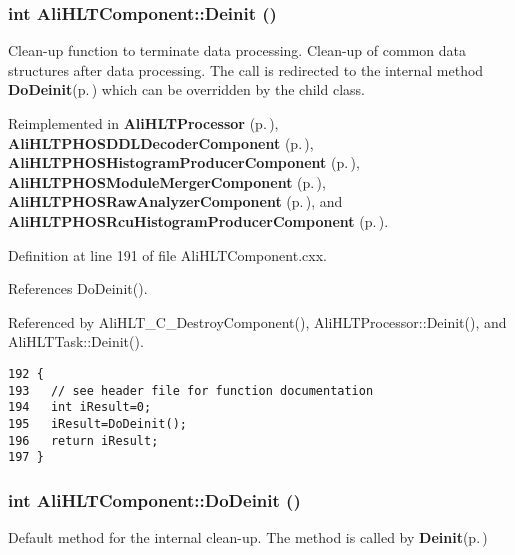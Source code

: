 \subsubsection{\setlength{\rightskip}{0pt plus 5cm}int Ali\-HLTComponent::Deinit ()\hspace{0.3cm}{\tt  [virtual]}}\label{classAliHLTComponent_a5}


Clean-up function to terminate data processing. Clean-up of common data structures after data processing. The call is redirected to the internal method {\bf Do\-Deinit}{\rm (p.\,\pageref{classAliHLTComponent_b6})} which can be overridden by the child class. 

Reimplemented in {\bf Ali\-HLTProcessor} {\rm (p.\,\pageref{classAliHLTProcessor_a3})}, {\bf Ali\-HLTPHOSDDLDecoder\-Component} {\rm (p.\,\pageref{classAliHLTPHOSDDLDecoderComponent_a5})}, {\bf Ali\-HLTPHOSHistogram\-Producer\-Component} {\rm (p.\,\pageref{classAliHLTPHOSHistogramProducerComponent_a5})}, {\bf Ali\-HLTPHOSModule\-Merger\-Component} {\rm (p.\,\pageref{classAliHLTPHOSModuleMergerComponent_a5})}, {\bf Ali\-HLTPHOSRaw\-Analyzer\-Component} {\rm (p.\,\pageref{classAliHLTPHOSRawAnalyzerComponent_a5})}, and {\bf Ali\-HLTPHOSRcu\-Histogram\-Producer\-Component} {\rm (p.\,\pageref{classAliHLTPHOSRcuHistogramProducerComponent_a3})}.

Definition at line 191 of file Ali\-HLTComponent.cxx.

References Do\-Deinit().

Referenced by Ali\-HLT\_\-C\_\-Destroy\-Component(), Ali\-HLTProcessor::Deinit(), and Ali\-HLTTask::Deinit().

\footnotesize\begin{verbatim}192 {
193   // see header file for function documentation
194   int iResult=0;
195   iResult=DoDeinit();
196   return iResult;
197 }
\end{verbatim}\normalsize 


\subsubsection{\setlength{\rightskip}{0pt plus 5cm}int Ali\-HLTComponent::Do\-Deinit ()\hspace{0.3cm}{\tt  [protected, virtual]}}\label{classAliHLTComponent_b6}


Default method for the internal clean-up. The method is called by {\bf Deinit}{\rm (p.\,\pageref{classAliHLTComponent_a5})} 

